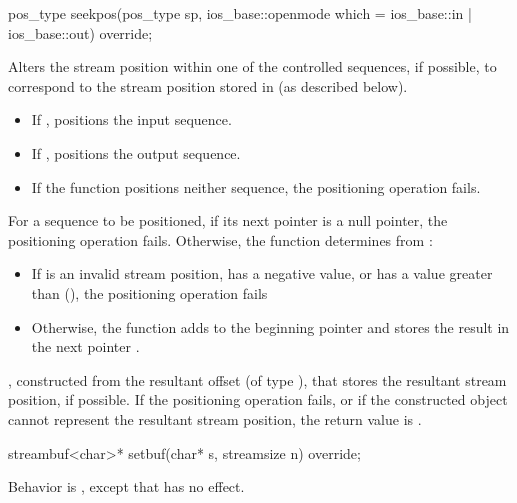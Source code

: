 %
\begin{itemdecl}
pos_type seekpos(pos_type sp, ios_base::openmode which
                  = ios_base::in | ios_base::out) override;
\end{itemdecl}

\begin{itemdescr}
\pnum
\effects
Alters the stream position within one of the
controlled sequences, if possible, to correspond to the
stream position stored in 
(as described below).
\begin{itemize}
\item
If
,
positions the input sequence.
\item
If
,
positions the output sequence.
\item
If the function positions neither sequence, the positioning operation fails.
\end{itemize}

\pnum
For a sequence to be positioned, if its next pointer is a null pointer,
the positioning operation fails.
Otherwise, the function determines  from
:
\begin{itemize}
\item
If  is an invalid stream position,
has a negative value, or
has a value greater than (),
the positioning operation fails
\item
Otherwise, the function
adds  to the beginning pointer  and
stores the result in the next pointer .
\end{itemize}

\pnum
\returns
{},
constructed from the resultant offset 
(of type
),
that stores the resultant stream position, if possible.
If the positioning operation fails, or
if the constructed object cannot represent the resultant stream position,
the return value is
.
\end{itemdescr}

%
\begin{itemdecl}
streambuf<char>* setbuf(char* s, streamsize n) override;
\end{itemdecl}

\begin{itemdescr}
\pnum
\effects
Behavior is ,
except that
has no effect.%
\end{itemdescr}

